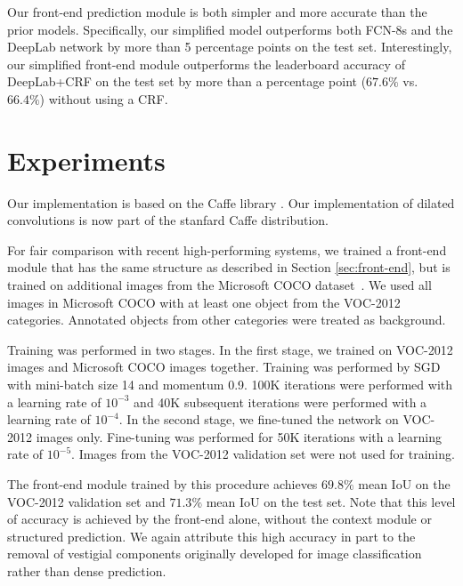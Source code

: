 \documentclass{article} %
\begin{document}
Our front-end prediction module is both simpler and more accurate than the prior models. Specifically, our simplified model outperforms both FCN-8s and the DeepLab network by more than 5 percentage points on the test set. Interestingly, our simplified front-end module outperforms the leaderboard accuracy of DeepLab+CRF on the test set by more than a percentage point ($67.6\%$ vs.~$66.4\%$) without using a CRF.


\section{Experiments}
\label{sec:evaluation}

Our implementation is based on the Caffe library \citep{Jia2014}. Our implementation of dilated convolutions is now part of the stanfard Caffe distribution.

For fair comparison with recent high-performing systems, we trained a front-end module that has the same structure as described in Section \ref{sec:front-end}, but is trained on additional images from the Microsoft COCO dataset~\citep{Lin2014}. We used all images in Microsoft COCO with at least one object from the VOC-2012 categories. Annotated objects from other categories were treated as background.

Training was performed in two stages. In the first stage, we trained on VOC-2012 images and Microsoft COCO images together. Training was performed by SGD with mini-batch size 14 and momentum 0.9. 100K iterations were performed with a learning rate of $10^{-3}$ and 40K subsequent iterations were performed with a learning rate of $10^{-4}$. In the second stage, we fine-tuned the network on \mbox{VOC-2012} images only. Fine-tuning was performed for 50K iterations with a learning rate of $10^{-5}$. Images from the VOC-2012 validation set were not used for training.

The front-end module trained by this procedure achieves $69.8\%$ mean IoU on the VOC-2012 validation set and $71.3\%$ mean IoU on the test set. Note that this level of accuracy is achieved by the front-end alone, without the context module or structured prediction. We again attribute this high accuracy in part to the removal of vestigial components originally developed for image classification rather than dense prediction.
\end{document}

